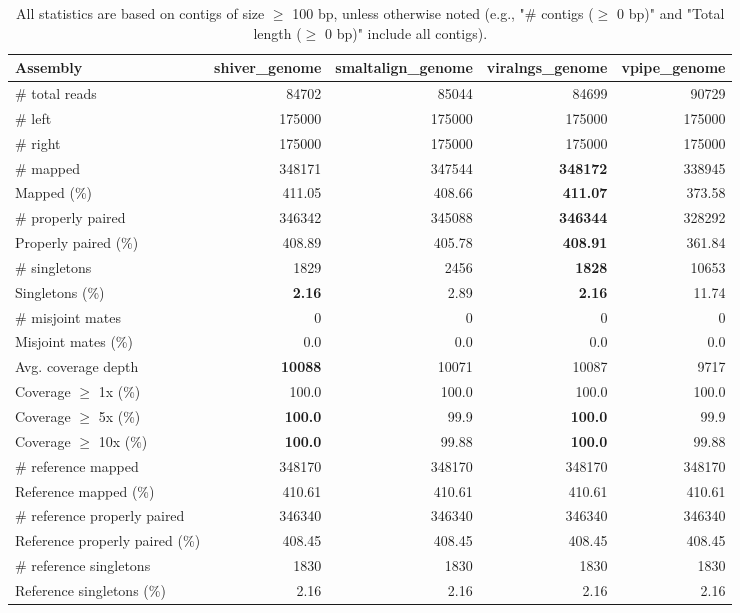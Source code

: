 \documentclass[12pt,a4paper]{article}
\begin{document}
\begin{table}[ht]
\begin{center}
\caption{All statistics are based on contigs of size $\geq$ 100 bp, unless otherwise noted (e.g., "\# contigs ($\geq$ 0 bp)" and "Total length ($\geq$ 0 bp)" include all contigs).}
\begin{tabular}{|l*{4}{|r}|}
\hline
Assembly & shiver\_genome & smaltalign\_genome & viralngs\_genome & vpipe\_genome \\ \hline
\# total reads & 84702 & 85044 & 84699 & 90729 \\ \hline
\# left & 175000 & 175000 & 175000 & 175000 \\ \hline
\# right & 175000 & 175000 & 175000 & 175000 \\ \hline
\# mapped & 348171 & 347544 & {\bf 348172} & 338945 \\ \hline
Mapped (\%) & 411.05 & 408.66 & {\bf 411.07} & 373.58 \\ \hline
\# properly paired & 346342 & 345088 & {\bf 346344} & 328292 \\ \hline
Properly paired (\%) & 408.89 & 405.78 & {\bf 408.91} & 361.84 \\ \hline
\# singletons & 1829 & 2456 & {\bf 1828} & 10653 \\ \hline
Singletons (\%) & {\bf 2.16} & 2.89 & {\bf 2.16} & 11.74 \\ \hline
\# misjoint mates & 0 & 0 & 0 & 0 \\ \hline
Misjoint mates (\%) & 0.0 & 0.0 & 0.0 & 0.0 \\ \hline
Avg. coverage depth & {\bf 10088} & 10071 & 10087 & 9717 \\ \hline
Coverage $\geq$ 1x (\%) & 100.0 & 100.0 & 100.0 & 100.0 \\ \hline
Coverage $\geq$ 5x (\%) & {\bf 100.0} & 99.9 & {\bf 100.0} & 99.9 \\ \hline
Coverage $\geq$ 10x (\%) & {\bf 100.0} & 99.88 & {\bf 100.0} & 99.88 \\ \hline
\# reference mapped & 348170 & 348170 & 348170 & 348170 \\ \hline
Reference mapped (\%) & 410.61 & 410.61 & 410.61 & 410.61 \\ \hline
\# reference properly paired & 346340 & 346340 & 346340 & 346340 \\ \hline
Reference properly paired (\%) & 408.45 & 408.45 & 408.45 & 408.45 \\ \hline
\# reference singletons & 1830 & 1830 & 1830 & 1830 \\ \hline
Reference singletons (\%) & 2.16 & 2.16 & 2.16 & 2.16 \\ \hline

\end{tabular}
\end{center}
\end{table}
\end{document}
